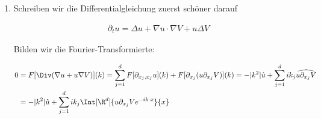 
\begin{solution}

\phantom{}
\begin{enumerate}[label = (\roman*)]
  \item Schreiben wir die Differentialgleichung zuerst schöner darauf

  \begin{align*}
    \partial_t u
    =
    \Delta u + \nabla u \cdot \nabla V + u \Delta V
  \end{align*}

  Bilden wir die Fourier-Transformierte:

  \begin{align*}
    0
    &=
    F[\Div(\nabla u + u \nabla V)](k)
    =
    \sum_{j = 1}^d F[\partial_{x_j,x_j}u](k) +  F[\partial_{x_j}(u \partial_{x_j}V)](k)
    =
    -|k^2| \hat{u} + \sum_{j = 1}^d i k_j \widehat{u \partial_{x_j}V} \\
    &=
    -|k^2| \hat{u} + \sum_{j = 1}^d i k_j
    \Int[\R^d]{
      u \partial_{x_j}V e^{-ik \cdot x}
    }{x}
  \end{align*}
\end{enumerate}

\end{solution}

